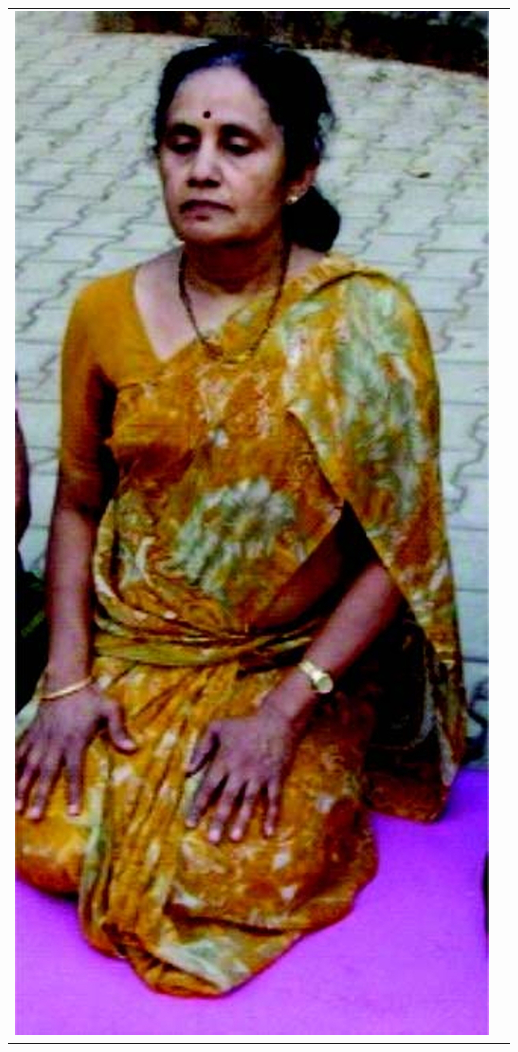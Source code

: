 \begin{center}
\begin{tabular}{@{}cc@{}}
\includegraphics[scale=.6]{images/093.jpg} &

\end{tabular}
\end{center}
